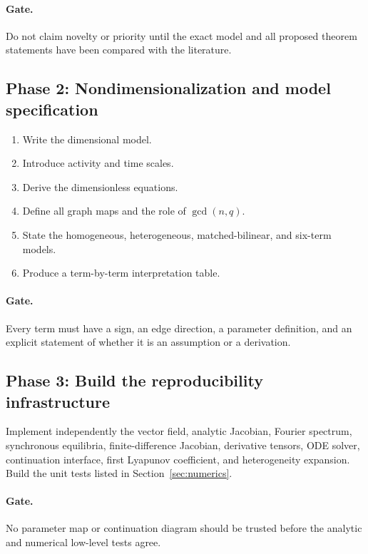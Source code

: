 \documentclass[11pt, reqno]{amsart}
\theoremstyle{definition}
\theoremstyle{remark}
\begin{document}
	\paragraph{Gate.}
	Do not claim novelty or priority until the exact model and all proposed theorem
	statements have been compared with the literature.
	
	\subsection{Phase 2: Nondimensionalization and model specification}
	
	\begin{enumerate}[label=2.\arabic*,leftmargin=3em]
		\item Write the dimensional model.
		\item Introduce activity and time scales.
		\item Derive the dimensionless equations.
		\item Define all graph maps and the role of $\gcd(n,q)$.
		\item State the homogeneous, heterogeneous, matched-bilinear, and six-term
		models.
		\item Produce a term-by-term interpretation table.
	\end{enumerate}
	
	\paragraph{Gate.}
	Every term must have a sign, an edge direction, a parameter definition, and an
	explicit statement of whether it is an assumption or a derivation.
	
	\subsection{Phase 3: Build the reproducibility infrastructure}
	
	Implement independently the vector field, analytic Jacobian, Fourier spectrum,
	synchronous equilibria, finite-difference Jacobian, derivative tensors, ODE
	solver, continuation interface, first Lyapunov coefficient, and heterogeneity
	expansion.  Build the unit tests listed in Section~\ref{sec:numerics}.
	
	\paragraph{Gate.}
	No parameter map or continuation diagram should be trusted before the analytic
	and numerical low-level tests agree.
	
\end{document}
